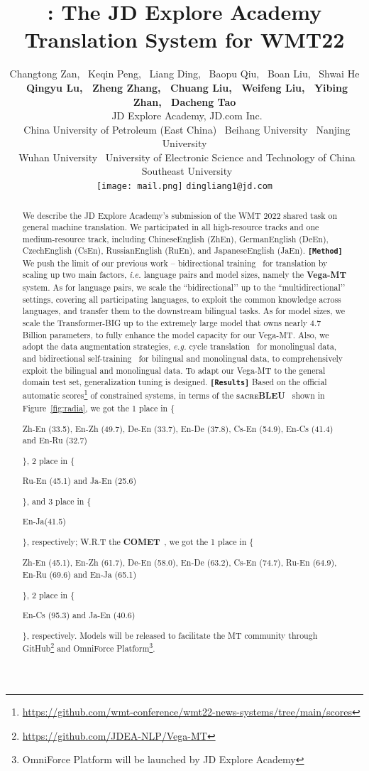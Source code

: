 \documentclass[11pt,a4paper]{article}
\title{\text{\begin{LARGE}{Vega-MT}\end{LARGE}}: The JD Explore Academy Translation System for WMT22}
\author{Changtong Zan,
\ Keqin Peng, 
\ Liang Ding, 
\ Baopu Qiu, 
\ Boan Liu, 
\ Shwai He
\\ 
\ \textbf{Qingyu Lu, 
\ Zheng Zhang, 
\ Chuang Liu, 
\ Weifeng Liu, 
\ Yibing Zhan, 
\ Dacheng Tao} \\
\ JD Explore Academy, JD.com Inc. \\
\ China University of Petroleum (East China) 
\ Beihang University
\ Nanjing University\\
\ Wuhan University
\ University of Electronic Science and Technology of China
\ Southeast University\\
\texttt{[image: mail.png]} \texttt{dingliang1@jd.com}
}
\newcommand{\zct}{\color{black}}
\begin{document}
\maketitle
\renewcommand{\thefootnote}{\fnsymbol{footnote}}
\begin{abstract}
We describe the JD Explore Academy's submission of the WMT 2022 {\zct shared task on general machine translation}. We participated in all high-resource tracks and one medium-resource track, including ChineseEnglish (ZhEn), GermanEnglish (DeEn), CzechEnglish (CsEn), RussianEnglish (RuEn), and JapaneseEnglish (JaEn). 
\texttt{\bf [Method]}
We push the limit of our previous work -- bidirectional training~\cite{ding2021improving} for translation by scaling up two main factors, \textit{i.e.} language pairs and model sizes, namely the \textbf{Vega-MT} system. As for language pairs, we scale the ``bidirectional’’ up to the ``multidirectional’’ settings, covering all participating languages, to exploit the common knowledge across languages, and transfer them to the downstream bilingual tasks.  As for model sizes, we scale the Transformer-\textsc{BIG} up to the extremely large model that owns nearly 4.7 Billion parameters, to fully enhance the model capacity for our Vega-MT. Also, we adopt the data augmentation strategies, \textit{e.g.} cycle translation~\cite{ding2019usyd} for monolingual data, and bidirectional self-training~\cite{ding2021usyd} for bilingual and monolingual data, to comprehensively exploit the bilingual and monolingual data. To adapt our Vega-MT to the general domain test set, generalization tuning is designed.
\texttt{\bf [Results]}
Based on the official automatic scores\footnote{\url{https://github.com/wmt-conference/wmt22-news-systems/tree/main/scores}} of constrained systems, in terms of the \textbf{\textsc{sacreBLEU}}~\cite{post-2018-call} shown in Figure~\ref{fig:radia}, we got the 1 {\zct place in} \{\begin{small}Zh-En (33.5), En-Zh (49.7), De-En (33.7), En-De (37.8), Cs-En (54.9), En-Cs (41.4) and En-Ru (32.7)\end{small}\}, 2 {\zct place in} \{\begin{small}Ru-En (45.1) and Ja-En (25.6)\end{small}\}, and 3 {\zct place in} \{\begin{small}En-Ja(41.5)\end{small}\}, respectively; W.R.T the \textbf{\textsc{COMET}}~\cite{rei-etal-2020-comet}, we got the 1 {\zct place in} \{\begin{small}Zh-En (45.1), En-Zh (61.7), De-En (58.0), En-De (63.2), Cs-En (74.7), Ru-En (64.9), En-Ru (69.6) and En-Ja (65.1)\end{small}\}, 2 {\zct place in} \{\begin{small}En-Cs (95.3) and Ja-En (40.6)\end{small}\}, respectively. Models will be released to facilitate the MT community through GitHub\footnote{\url{https://github.com/JDEA-NLP/Vega-MT}} and OmniForce Platform\footnote{OmniForce Platform will be launched by JD Explore Academy}.
\end{abstract}
\end{document}
